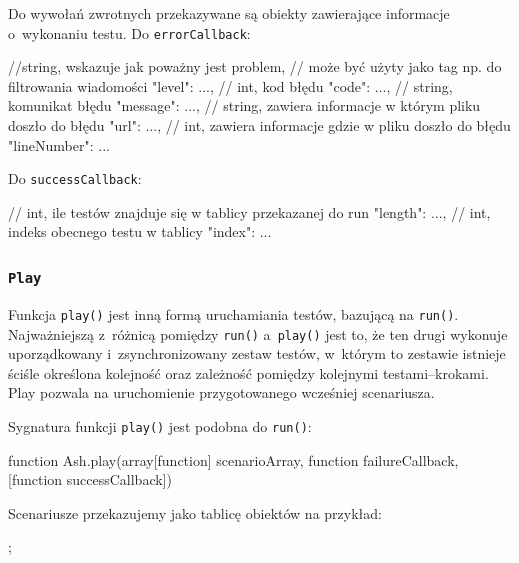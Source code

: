\documentclass{xmgr}
\begin{document}
Do wywołań zwrotnych przekazywane są obiekty zawierające informacje o~wykonaniu testu. Do \texttt{errorCallback}:

\begin{javascriptcode}
	{
    //string, wskazuje jak poważny jest problem, 
    //  może być użyty jako tag np. do filtrowania wiadomości 
		"level":  ...,
    //  int, kod błędu
		"code":   ...,
    // string, komunikat błędu
		"message":   ...,
    // string, zawiera informacje w którym pliku doszło do błędu  
		"url":   ...,
    // int, zawiera informacje gdzie w pliku doszło do błędu
		"lineNumber":  ...
	}
\end{javascriptcode}

Do \texttt{successCallback}: 

\begin{javascriptcode}
	{
    // int, ile testów znajduje się w tablicy przekazanej do run 
		"length":  ...,
    // int, indeks obecnego testu w tablicy 
		"index": ...
	}
\end{javascriptcode}

\subsubsection{\texttt{Play}} 

Funkcja \texttt{play()} jest inną formą uruchamiania testów, bazującą na \texttt{run()}. Najważniejszą z~różnicą pomiędzy \texttt{run()} a~\texttt{play()} jest to, że ten drugi wykonuje uporządkowany i~zsynchronizowany zestaw testów, w~którym to zestawie istnieje ściśle określona kolejność oraz zależność pomiędzy kolejnymi testami--krokami. Play pozwala na uruchomienie przygotowanego wcześniej scenariusza. 

Sygnatura funkcji \texttt{play()} jest podobna do \texttt{run()}:

\begin{javascriptcode}
function Ash.play(array[function] scenarioArray, 
                  function failureCallback, 
                  [function successCallback]) 
\end{javascriptcode}

Scenariusze przekazujemy jako tablicę obiektów na przykład:

\begin{javascriptcode}
;
\end{javascriptcode}
\end{document}
